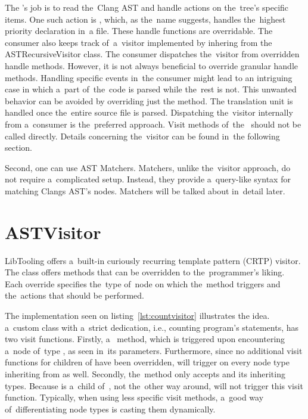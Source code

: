 The 's job is to read the~Clang AST and handle actions
on the~tree's specific items. 
One such action is , which, as the~name suggests,
handles the~highest priority declaration in~a file. 
These handle functions are overridable. 
The consumer also keeps track of~a~visitor implemented by inhering from 
the ASTRecursiveVisitor class. 
The consumer dispatches the~visitor from overridden handle methods. 
However, it is not always beneficial to override granular handle methods. 
Handling specific events in~the consumer might lead to an intriguing case 
in which a~part of~the~code is parsed while the~rest is not. 
This unwanted behavior can be avoided by overriding just 
the  method. 
The translation unit is handled once the~entire source file is parsed. 
Dispatching the~visitor internally from a~consumer is the~preferred 
approach. 
Visit methods of~the~ should not be called 
directly. 
Details concerning the~visitor can be found in~the following section.

Second, one can use AST Matchers. 
Matchers, unlike the~visitor approach, do not require a~complicated setup. 
Instead, they provide a~query-like syntax for matching Clangs AST's nodes. 
Matchers will be talked about in~detail later.

\section{ASTVisitor}

LibTooling offers a~built-in curiously recurring template pattern 
(CRTP) visitor. 
The class  \citep{visitor:online} 
offers  methods that 
can be overridden to the~programmer's liking. 
Each override specifies the~type of~node on which the~method 
triggers and the~actions that should be performed.

The implementation seen on listing~\ref{lst:countvisitor} illustrates
the idea. a~custom class with a~strict dedication, i.e., counting
program's statements, has two visit functions.
Firstly, a~ method, which is triggered upon
encountering a~node of~type , as seen in~its
parameters. 
Furthermore, since no additional visit functions for children 
of  have been overridden, 
will trigger on every node type inheriting from  as well.
Secondly, the~method  only accepts 
and its inheriting types.
Because  is a~child of~, not the~other way
around,  will not trigger this visit function.
Typically, when using less specific visit methods, a~good 
way of~differentiating node types is casting them dynamically.

